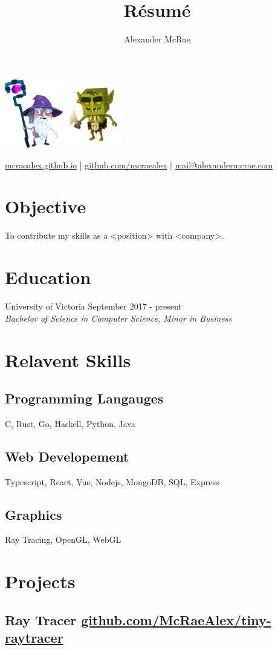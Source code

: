 \documentclass{article}
\makeatletter
\renewcommand{\maketitle}{
\begin{center}
\includegraphics[height=3cm]{cedric-desktop.png}
{\huge \bfseries \theauthor}
\includegraphics[height=3cm]{goblin.png}

\vspace{0.25em}
\url{mcraealex.github.io} | \url{github.com/mcraealex} | \href{mailto:mail@alexandermcrae.com}{mail@alexandermcrae.com}
\end{center}}
\makeatother
\begin{document}
\title{R\'esum\'e}
\author{Alexander McRae}

\maketitle

\section{Objective}

To contribute my skills as a <position> with <company>.

\section{Education}

University of Victoria \hfill September 2017 - present\\
\textit{Bachelor of Science in Computer Science, Minor in Business}

\section{Relavent Skills}

\subsection{Programming Langauges}

C, Rust, Go, Haskell, Python, Java

\subsection{Web Developement}

Typescript, React, Vue, Nodejs, MongoDB, SQL, Express

\subsection{Graphics}

Ray Tracing, OpenGL, WebGL

\section{Projects}

\subsection{Ray Tracer \href{github.com/McRaeAlex/tiny-raytracer}{github.com/McRaeAlex/tiny-raytracer}}
\end{document}
